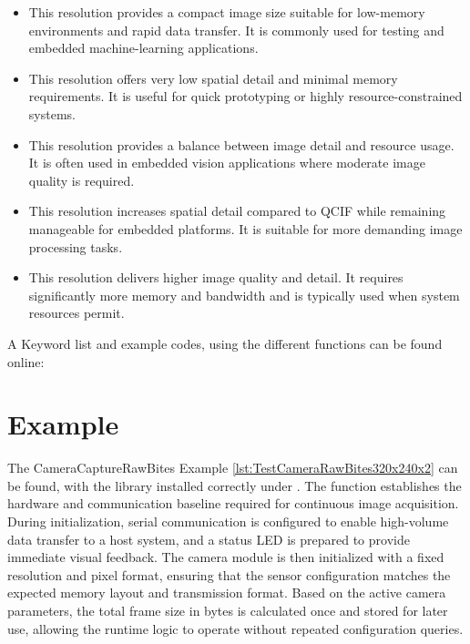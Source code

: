 \begin{itemize}
	\item {} 
	
	This resolution provides a compact image size suitable for low-memory environments and rapid data transfer. It is commonly used for testing and embedded machine-learning applications.
	
	\item {} 
	
	This resolution offers very low spatial detail and minimal memory requirements. It is useful for quick prototyping or highly resource-constrained systems.
	
	\item {} 
	
	This resolution provides a balance between image detail and resource usage. It is often used in embedded vision applications where moderate image quality is required.
	
	\item {} 
	
	This resolution increases spatial detail compared to QCIF while remaining manageable for embedded platforms. It is suitable for more demanding image processing tasks.
	
	\item {} 
	
	This resolution delivers higher image quality and detail. It requires significantly more memory and bandwidth and is typically used when system resources permit.
\end{itemize}

A Keyword list and example codes, using the different functions can be found online: 

\section{Example}

The CameraCaptureRawBites Example \ref{lst:TestCameraRawBites320x240x2} can be found, with the library installed correctly under .
The function  establishes the hardware and communication baseline required for continuous image acquisition. During initialization, serial communication is configured to enable high-volume data transfer to a host system, and a status LED is prepared to provide immediate visual feedback. The camera module is then initialized with a fixed resolution and pixel format, ensuring that the sensor configuration matches the expected memory layout and transmission format. Based on the active camera parameters, the total frame size in bytes is calculated once and stored for later use, allowing the runtime logic to operate without repeated configuration queries.

